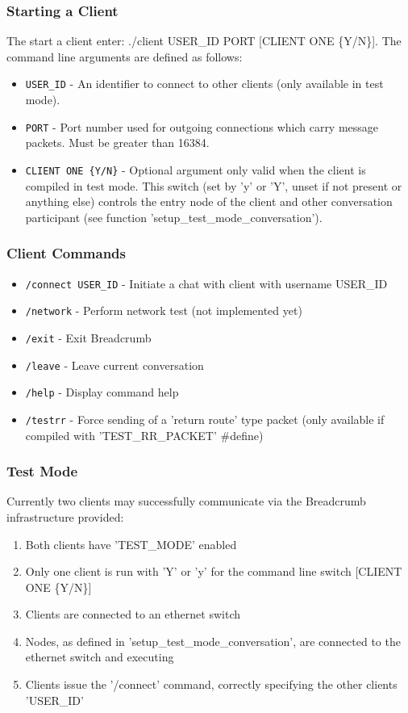 \documentclass{article}
\begin{document}
\subsubsection{Starting a Client}
The start a client enter: ./client USER\_ID PORT [CLIENT ONE \{Y/N\}]. The command line arguments are defined as follows:
\begin{itemize}
	\item \texttt{USER\_ID} - An identifier to connect to other clients (only available in test mode).
	\item \texttt{PORT} - Port number used for outgoing connections which carry message packets. Must be greater than 16384.
	\item \texttt{CLIENT ONE \{Y/N\}} - Optional argument only valid when the client is compiled in test mode. This switch (set by 'y' or 'Y', unset if not present or anything else) controls the entry node of the client and other conversation participant (see function 'setup\_test\_mode\_conversation').
\end{itemize}
\subsubsection{Client Commands}
\begin{itemize}
	\item \texttt{/connect USER\_ID} - Initiate a chat with client with username USER\_ID
	\item \texttt{/network} - Perform network test (not implemented yet)
	\item \texttt{/exit} - Exit Breadcrumb
	\item \texttt{/leave} - Leave current conversation
	\item \texttt{/help} - Display command help
	\item \texttt{/testrr} - Force sending of a 'return route' type packet (only available if compiled with 'TEST\_RR\_PACKET' \#define)
\end{itemize}
\subsubsection{Test Mode}
Currently two clients may successfully communicate via the Breadcrumb infrastructure provided:
\begin{enumerate}
	\item Both clients have 'TEST\_MODE' enabled
	\item Only one client is run with 'Y' or 'y' for the command line switch [CLIENT ONE \{Y/N\}]
	\item Clients are connected to an ethernet switch
	\item Nodes, as defined in 'setup\_test\_mode\_conversation', are connected to the ethernet switch and executing
	\item Clients issue the '/connect' command, correctly specifying the other clients 'USER\_ID'
\end{enumerate}
\end{document}
